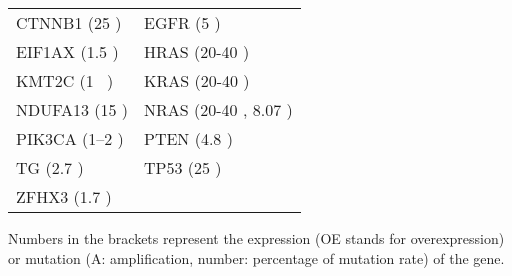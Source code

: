 \documentclass[a4paper,12pt]{article}
\begin{document}
\begin{table}[!htb]
\begin{tabular}{ll}
CTNNB1 (25 \cite{Xing2013} ) & EGFR (5 \cite{Xing2013} ) \\ EIF1AX (1.5 \cite{Agrawal2014, Yoo2016} ) & HRAS (20-40 \cite{Xing2013, Howell2013} ) \\
KMT2C (1 \cite{Agrawal2014}\, \cite{Landa2016} ) & KRAS (20-40 \cite{Xing2013, Howell2013} ) \\ NDUFA13 (15 \cite{Xing2013} ) & NRAS (20-40 \cite{Xing2013}, 8.07 \cite{Rubio-Perez2015, Howell2013} ) \\
PIK3CA (1–2 \cite{Xing2013} ) & PTEN (4.8 \cite{Nagy2011, Xing2013} ) \\ TG (2.7 \cite{Agrawal2014} ) & TP53 (25 \cite{Xing2013} ) \\
ZFHX3 (1.7 \cite{Agrawal2014} ) & \\
\bottomrule
\end{tabular}
\begin{flushleft} Numbers in the brackets represent the expression (OE stands for overexpression) or mutation (A: amplification, number: percentage of mutation rate) of the gene. 
\end{flushleft}
\end{table}

\clearpage


\end{document}
